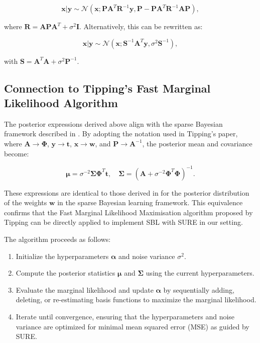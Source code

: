 \documentclass{article}
\begin{document}
\begin{equation}
    \mathbf{x}|\mathbf{y} \sim \mathcal{N}\left(\mathbf{x}; \mathbf{P}\mathbf{A}^T\mathbf{R}^{-1}\mathbf{y}, \mathbf{P} - \mathbf{P}\mathbf{A}^T\mathbf{R}^{-1}\mathbf{A}\mathbf{P}\right),
\end{equation}

where $\mathbf{R} = \mathbf{A}\mathbf{P}\mathbf{A}^T + \sigma^2 \mathbf{I}$. Alternatively, this can be rewritten as:

\begin{equation}
    \mathbf{x}|\mathbf{y} \sim \mathcal{N}\left(\mathbf{x}; \mathbf{S}^{-1}\mathbf{A}^T\mathbf{y}, \sigma^2 \mathbf{S}^{-1}\right),
\end{equation}

with $\mathbf{S} = \mathbf{A}^T\mathbf{A} + \sigma^2 \mathbf{P}^{-1}$. 

\subsection{Connection to Tipping's Fast Marginal Likelihood Algorithm}
The posterior expressions derived above align with the sparse Bayesian framework described in \cite{tipp2003fastsb}. By adopting the notation used in Tipping's paper, where $\mathbf{A} \rightarrow \boldsymbol{\Phi}$, $\mathbf{y} \rightarrow \mathbf{t}$, $\mathbf{x} \rightarrow \mathbf{w}$, and $\mathbf{P} \rightarrow \mathbf{A}^{-1}$, the posterior mean and covariance become:

\begin{equation}
    \boldsymbol{\mu} = \sigma^{-2}\boldsymbol{\Sigma}\boldsymbol{\Phi}^T\mathbf{t}, \quad \boldsymbol{\Sigma} = \left(\mathbf{A} + \sigma^{-2}\boldsymbol{\Phi}^T\boldsymbol{\Phi}\right)^{-1}.
\end{equation}

These expressions are identical to those derived in \cite{tipping2003} for the posterior distribution of the weights $\mathbf{w}$ in the sparse Bayesian learning framework. This equivalence confirms that the Fast Marginal Likelihood Maximisation algorithm proposed by Tipping can be directly applied to implement SBL with SURE in our setting.

The algorithm proceeds as follows:
\begin{enumerate}
    \item Initialize the hyperparameters $\boldsymbol{\alpha}$ and noise variance $\sigma^2$.
    \item Compute the posterior statistics $\boldsymbol{\mu}$ and $\boldsymbol{\Sigma}$ using the current hyperparameters.
    \item Evaluate the marginal likelihood and update $\boldsymbol{\alpha}$ by sequentially adding, deleting, or re-estimating basis functions to maximize the marginal likelihood.
    \item Iterate until convergence, ensuring that the hyperparameters and noise variance are optimized for minimal mean squared error (MSE) as guided by SURE.
\end{enumerate}
\end{document}
